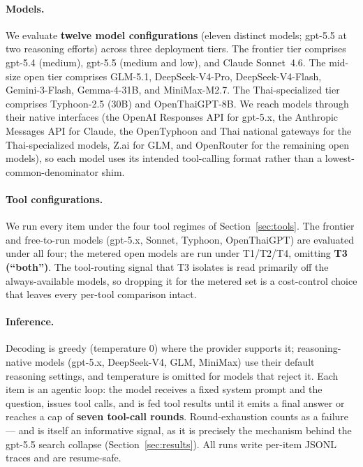 \documentclass[11pt]{article}
\begin{document}
\paragraph{Models.} We evaluate \textbf{twelve model configurations} (eleven distinct models; gpt-5.5
at two reasoning efforts) across three deployment tiers. The frontier tier comprises gpt-5.4 (medium),
gpt-5.5 (medium and low), and Claude Sonnet~4.6. The mid-size open tier comprises GLM-5.1,
DeepSeek-V4-Pro, DeepSeek-V4-Flash, Gemini-3-Flash, Gemma-4-31B, and MiniMax-M2.7. The Thai-specialized
tier comprises Typhoon-2.5 (30B) and OpenThaiGPT-8B. We reach models through their native interfaces
(the OpenAI Responses API for gpt-5.x, the Anthropic Messages API for Claude, the OpenTyphoon and Thai
national gateways for the Thai-specialized models, Z.ai for GLM, and OpenRouter for the remaining open
models), so each model uses its intended tool-calling format rather than a lowest-common-denominator
shim.

\paragraph{Tool configurations.} We run every item under the four tool regimes of
Section~\ref{sec:tools}. The frontier and free-to-run models (gpt-5.x, Sonnet, Typhoon, OpenThaiGPT)
are evaluated under all four; the metered open models are run under T1/T2/T4, omitting \textbf{T3
(``both'')}. The tool-routing signal that T3 isolates is read primarily off the always-available
models, so dropping it for the metered set is a cost-control choice that leaves every per-tool
comparison intact.

\paragraph{Inference.} Decoding is greedy (temperature 0) where the provider supports it;
reasoning-native models (gpt-5.x, DeepSeek-V4, GLM, MiniMax) use their default reasoning settings, and
temperature is omitted for models that reject it. Each item is an agentic loop: the model receives a
fixed system prompt and the question, issues tool calls, and is fed tool results until it emits a final
answer or reaches a cap of \textbf{seven tool-call rounds}. Round-exhaustion counts as a failure --- and
is itself an informative signal, as it is precisely the mechanism behind the gpt-5.5 search collapse
(Section~\ref{sec:results}). All runs write per-item JSONL traces and are resume-safe.
\end{document}
